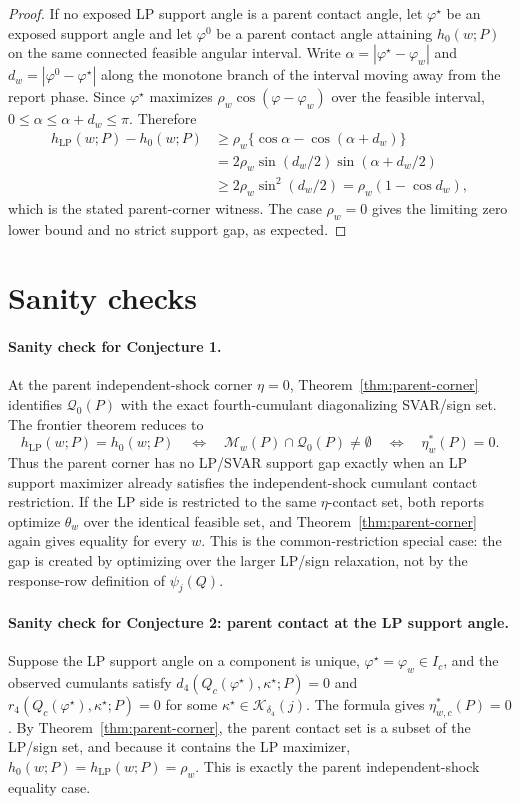 \documentclass[11pt]{article}
\theoremstyle{definition}
\theoremstyle{plain}
\theoremstyle{remark}
\begin{document}
\begin{proof}
If no exposed LP support angle is a parent contact angle, let \(\varphi^\star\) be an exposed support angle and let \(\varphi^0\) be a parent contact angle attaining \(h_0(w;P)\) on the same connected feasible angular interval.  Write \(\alpha=|\varphi^\star-\varphi_w|\) and \(d_w=|\varphi^0-\varphi^\star|\) along the monotone branch of the interval moving away from the report phase.  Since \(\varphi^\star\) maximizes \(\rho_w\cos(\varphi-\varphi_w)\) over the feasible interval, \(0\le\alpha\le\alpha+d_w\le\pi\).  Therefore
\[
\begin{aligned}
h_{\mathrm{LP}}(w;P)-h_0(w;P)
&\ge \rho_w\{\cos\alpha-\cos(\alpha+d_w)\}\\
&=2\rho_w\sin(d_w/2)\sin(\alpha+d_w/2)\\
&\ge 2\rho_w\sin^2(d_w/2)
=\rho_w(1-\cos d_w),
\end{aligned}
\]
which is the stated parent-corner witness.  The case \(\rho_w=0\) gives the limiting zero lower bound and no strict support gap, as expected.
\end{proof}

\section{Sanity checks}
\paragraph{Sanity check for Conjecture 1.}
At the parent independent-shock corner \(\eta=0\), Theorem~\ref{thm:parent-corner} identifies \(\mathcal Q_0(P)\) with the exact fourth-cumulant diagonalizing SVAR/sign set.  The frontier theorem reduces to
\[
h_{\mathrm{LP}}(w;P)=h_0(w;P)
\quad\Longleftrightarrow\quad
\mathcal M_w(P)\cap\mathcal Q_0(P)\ne\emptyset
\quad\Longleftrightarrow\quad
\eta_w^*(P)=0.
\]
Thus the parent corner has no LP/SVAR support gap exactly when an LP support maximizer already satisfies the independent-shock cumulant contact restriction.  If the LP side is restricted to the same \(\eta\)-contact set, both reports optimize \(\theta_w\) over the identical feasible set, and Theorem~\ref{thm:parent-corner} again gives equality for every \(w\).  This is the common-restriction special case: the gap is created by optimizing over the larger LP/sign relaxation, not by the response-row definition of \(\psi_j(Q)\).

\paragraph{Sanity check for Conjecture 2: parent contact at the LP support angle.}
Suppose the LP support angle on a component is unique, \(\varphi^\star=\varphi_w\in I_c\), and the observed cumulants satisfy \(d_4(Q_c(\varphi^\star),\kappa^\star;P)=0\) and \(r_4(Q_c(\varphi^\star),\kappa^\star;P)=0\) for some \(\kappa^\star\in\mathcal K_{\delta_4}(j)\).  The formula gives \(\eta_{w,c}^*(P)=0\).  By Theorem~\ref{thm:parent-corner}, the parent contact set is a subset of the LP/sign set, and because it contains the LP maximizer, \(h_0(w;P)=h_{\mathrm{LP}}(w;P)=\rho_w\).  This is exactly the parent independent-shock equality case.
\end{document}

